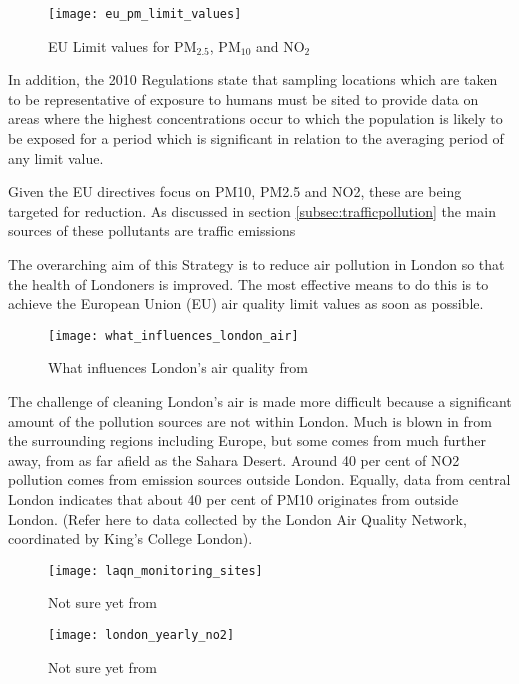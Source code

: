 \begin{figure}[H]
\centering
\texttt{[image: eu\_pm\_limit\_values]}
\caption{EU Limit values for PM$_{2.5}$, PM$_{10}$ and NO$_{2}$}
\label{fig:eu_pm_limit_values}
\end{figure}

In addition, the 2010 Regulations state that sampling locations which are taken to be representative of exposure to humans must be sited to provide data on areas where the highest concentrations occur to which the population is likely to be exposed for a period which is significant in relation to the averaging period of any limit value.

Given the EU directives focus on PM10, PM2.5 and NO2, these are being targeted for reduction. As discussed in section \ref{subsec:trafficpollution} the main sources of these pollutants are traffic emissions

The overarching aim of this Strategy is to reduce air pollution in London so that the health of Londoners is improved. The most effective means to do this is to achieve the European Union (EU) air quality limit values as soon as possible.

\begin{figure}[H]
\centering
\texttt{[image: what\_influences\_london\_air]}
\caption{What influences London's air quality from \cite{GreaterLondonAuthorityGLA2010}}
\label{fig:what_influences_london_air}
\end{figure}

\cite{GreaterLondonAuthorityGLA2010}
The challenge of cleaning London’s air is made more difficult because a significant amount of the pollution sources are not within London. Much is blown in from the surrounding regions including Europe, but some comes from much further away, from as far afield as the Sahara Desert. Around 40 per cent of NO2  pollution comes from emission sources outside London. Equally, data from central London indicates that about 40 per cent of PM10 originates from outside London. (Refer here to data collected by the London Air Quality Network, coordinated by King’s College London).

\begin{figure}[H]
\centering
\texttt{[image: laqn\_monitoring\_sites]}
\caption{Not sure yet from \cite{GreaterLondonAuthorityGLA2010}}
\label{fig:laqn_monitoring_sites}
\end{figure}

\begin{figure}[H]
\centering
\texttt{[image: london\_yearly\_no2]}
\caption{Not sure yet from \cite{GreaterLondonAuthorityGLA2010}}
\label{fig:london_yearly_no2}
\end{figure}

